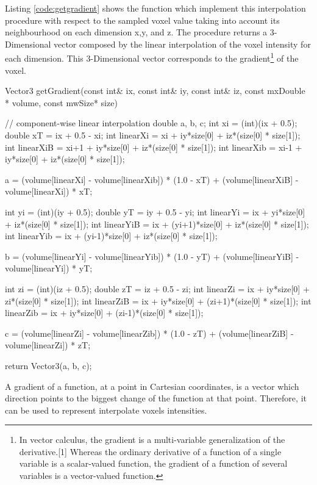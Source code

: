 \documentclass[12pt,a4paper]{extarticle}
\newcommand{\linespace}{\vspace{8pt}}
\begin{document}
Listing \ref{code:getgradient} shows the function which implement this interpolation procedure with respect to the sampled voxel value taking into account its neighbourhood on each dimension x,y, and z. The procedure returns a 3-Dimensional vector composed by the linear interpolation of the voxel intensity for each dimension. This 3-Dimensional vector corresponds to the gradient\footnote{In vector calculus, the gradient is a multi-variable generalization of the derivative.[1] Whereas the ordinary derivative of a function of a single variable is a scalar-valued function, the gradient of a function of several variables is a vector-valued function.\cite{gradient:7}} of the voxel. 

\begin{cpp}[caption={Component-wise linear interpolation functions computing voxel gradient},label=code:getgradient]
Vector3 getGradient(const int& ix, const int& iy, const int& iz, 
		const mxDouble * volume, const mwSize* size) {
	// component-wise linear interpolation
	double a, b, c;
	int xi = (int)(ix + 0.5);
	double xT = ix + 0.5 - xi;
	int linearXi = xi + iy*size[0] + iz*(size[0] * size[1]);
	int linearXiB = xi+1 + iy*size[0] + iz*(size[0] * size[1]);
	int linearXib = xi-1 + iy*size[0] + iz*(size[0] * size[1]);

	a = (volume[linearXi] - volume[linearXib]) * (1.0 - xT) + 
	(volume[linearXiB] - volume[linearXi]) * xT;
	
	int yi = (int)(iy + 0.5);
	double yT = iy + 0.5 - yi;
	int linearYi = ix + yi*size[0] + iz*(size[0] * size[1]);
	int linearYiB = ix + (yi+1)*size[0] + iz*(size[0] * size[1]);
	int linearYib = ix + (yi-1)*size[0] + iz*(size[0] * size[1]);
	
	b = (volume[linearYi] - volume[linearYib]) * (1.0 - yT) + 
	(volume[linearYiB] - volume[linearYi]) * yT;
	
	int zi = (int)(iz + 0.5);
	double zT = iz + 0.5 - zi;
	int linearZi = ix + iy*size[0] + zi*(size[0] * size[1]);
	int linearZiB = ix + iy*size[0] + (zi+1)*(size[0] * size[1]);
	int linearZib = ix + iy*size[0] + (zi-1)*(size[0] * size[1]);
	
	c = (volume[linearZi] - volume[linearZib]) * (1.0 - zT) + 
	(volume[linearZiB] - volume[linearZi]) * zT;
	
	return Vector3(a, b, c);
}
\end{cpp}

A gradient of a function, at a point in Cartesian coordinates, is a vector which direction points to the biggest change of the function at that point. Therefore, it can be used to represent interpolate voxels intensities.
\linespace
\end{document}
